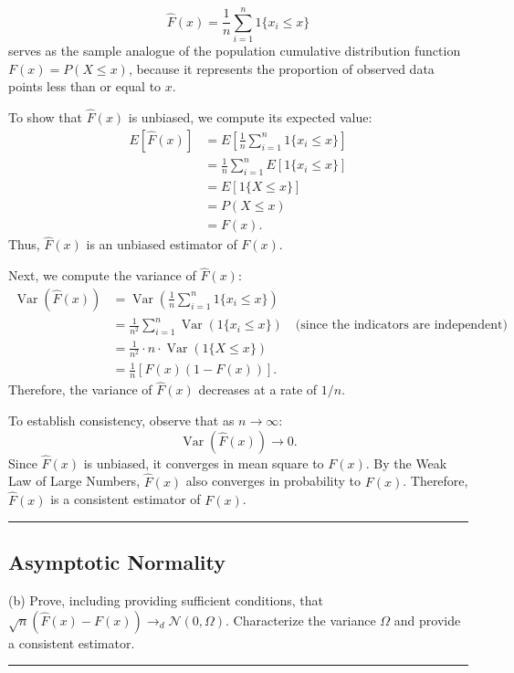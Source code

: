\documentclass{article}
\newenvironment{colorparagraph}[1]{\par\color{#1}}{\par}
\begin{document}
\[
\hat{F}(x) = \frac{1}{n} \sum_{i=1}^n 1\{ x_i \leq x \}
\]
serves as the sample analogue of the population cumulative distribution function \( F(x) = P(X \leq x) \), because it represents the proportion of observed data points less than or equal to \( x \).

To show that \( \hat{F}(x) \) is unbiased, we compute its expected value:
\[
\begin{aligned}
E[\hat{F}(x)] &= E\left[ \frac{1}{n} \sum_{i=1}^n 1\{ x_i \leq x \} \right] \\
&= \frac{1}{n} \sum_{i=1}^n E[1\{ x_i \leq x \}] \\
&= E[1\{ X \leq x \}] \\
&= P(X \leq x) \\
&= F(x).
\end{aligned}
\]
Thus, \( \hat{F}(x) \) is an unbiased estimator of \( F(x) \).

Next, we compute the variance of \( \hat{F}(x) \):
\[
\begin{aligned}
\operatorname{Var}(\hat{F}(x)) &= \operatorname{Var}\left( \frac{1}{n} \sum_{i=1}^n 1\{ x_i \leq x \} \right) \\
&= \frac{1}{n^2} \sum_{i=1}^n \operatorname{Var}(1\{ x_i \leq x \}) \quad \text{(since the indicators are independent)} \\
&= \frac{1}{n^2} \cdot n \cdot \operatorname{Var}(1\{ X \leq x \}) \\
&= \frac{1}{n} \left[ F(x)(1 - F(x)) \right].
\end{aligned}
\]
Therefore, the variance of \( \hat{F}(x) \) decreases at a rate of \( 1/n \).

To establish consistency, observe that as \( n \to \infty \):
\[
\operatorname{Var}(\hat{F}(x)) \to 0.
\]
Since \( \hat{F}(x) \) is unbiased, it converges in mean square to \( F(x) \). By the Weak Law of Large Numbers, \( \hat{F}(x) \) also converges in probability to \( F(x) \). Therefore, \( \hat{F}(x) \) is a consistent estimator of \( F(x) \).

\begin{colorparagraph}{questioncolor}
\label{q2b}
\rule{\textwidth}{0.5pt}
\subsection{Asymptotic Normality}
(b) Prove, including providing sufficient conditions, that \( \sqrt{n}(\hat{F}(x) - F(x)) \to_d \mathcal{N}(0, \Omega) \).
Characterize the variance \( \Omega \) and provide a consistent estimator.

\rule{\textwidth}{0.5pt}
\end{colorparagraph}
\end{document}
